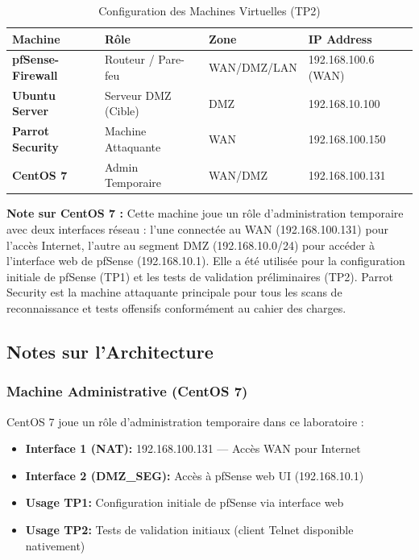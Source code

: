 \documentclass[12pt,a4paper,openany]{report}
\newcommand{\tableheadcolor}{\rowcolor{tableheadbg}}
\begin{document}
	\begin{table}[ht]
		\centering
		\renewcommand{\arraystretch}{1.4}
		\setlength{\arrayrulewidth}{0.5pt}
		\begin{tabular}{>{\bfseries}p{3.5cm} p{3.2cm} p{2.8cm} p{3.2cm}}
			\arrayrulecolor{tableborder}
			\hline
			\tableheadcolor
			\textcolor{tableheadfg}{\textbf{Machine}} &
			\textcolor{tableheadfg}{\textbf{Rôle}} &
			\textcolor{tableheadfg}{\textbf{Zone}} &
			\textcolor{tableheadfg}{\textbf{IP Address}} \\
			\hline
			\rowcolor{tablerowalt}
			pfSense-Firewall & Routeur / Pare-feu & WAN/DMZ/LAN & 192.168.100.6 (WAN) \\
			Ubuntu Server & Serveur DMZ (Cible) & DMZ & 192.168.10.100 \\
			\rowcolor{tablerowalt}
			Parrot Security & Machine Attaquante & WAN & 192.168.100.150 \\
			CentOS 7 & Admin Temporaire & WAN/DMZ & 192.168.100.131 \\
			\hline
		\end{tabular}
		\caption{Configuration des Machines Virtuelles (TP2)}
		\label{tab:vm-config-tp2}
	\end{table}
	
	\textbf{Note sur CentOS 7 :} Cette machine joue un rôle d'administration temporaire 
	avec deux interfaces réseau : l'une connectée au WAN (192.168.100.131) pour l'accès 
	Internet, l'autre au segment DMZ (192.168.10.0/24) pour accéder à l'interface web 
	de pfSense (192.168.10.1). Elle a été utilisée pour la configuration initiale de 
	pfSense (TP1) et les tests de validation préliminaires (TP2). Parrot Security est 
	la machine attaquante principale pour tous les scans de reconnaissance et tests 
	offensifs conformément au cahier des charges.
	
	
	
	\subsection{Notes sur l'Architecture}
	
	\subsubsection{Machine Administrative (CentOS 7)}
	CentOS 7 joue un rôle d'administration temporaire dans ce laboratoire :
	\begin{itemize}
		\item \textbf{Interface 1 (NAT):} 192.168.100.131 --- Accès WAN pour Internet
		\item \textbf{Interface 2 (DMZ\_SEG):} Accès à pfSense web UI (192.168.10.1)
		\item \textbf{Usage TP1:} Configuration initiale de pfSense via interface web
		\item \textbf{Usage TP2:} Tests de validation initiaux (client Telnet disponible nativement)
	\end{itemize}
	
\end{document}
